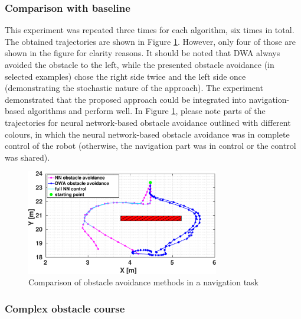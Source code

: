 \subsubsection{Comparison with baseline}

This experiment was repeated three times for each algorithm, six times in total. The obtained trajectories are shown in Figure \ref{fig:Fig11}. However, only four of those are shown in the figure for clarity reasons. It should be noted that DWA always avoided the obstacle to the left, while the presented obstacle avoidance (in selected examples) chose the right side twice and the left side once (demonstrating the stochastic nature of the approach). The experiment demonstrated that the proposed approach could be integrated into navigation-based algorithms and perform well. In Figure \ref{fig:Fig11}, please note parts of the trajectories for neural network-based obstacle avoidance outlined with different colours, in which the neural network-based obstacle avoidance was in complete control of the robot (otherwise, the navigation part was in control or the control was shared).

\begin{figure}
    \centering
    \includegraphics[width=0.75\textwidth]{slike/turkish/Fig11.pdf}
    \caption{Comparison of obstacle avoidance methods in a navigation task}
    \label{fig:Fig11}
\end{figure}

\subsubsection{Complex obstacle course}

